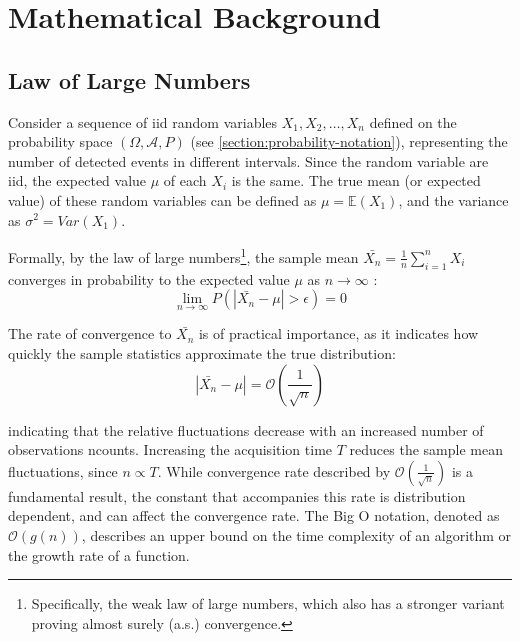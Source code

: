 \chapter{Mathematical Background}
\label{appendix:mathematical-notation}

\section{Law of Large Numbers}\label{section:law-of-large-numbers}
Consider a sequence of \gls{iid} random variables $X_1, X_2, \dots, X_n$ defined on the probability space $(\Omega, \mathcal{A}, P)$ (see \cref{section:probability-notation}), representing the number of detected events in different intervals. Since the random variable are \gls{iid}, the expected value $\mu$ of each $X_i$ is the same. The true mean (or expected value) of these random variables can be defined as $\mu = \mathbb{E}(X_1)$, and the variance as $\sigma^2 = Var(X_1)$.

Formally, by the law of large numbers\footnote{Specifically, the weak law of large numbers, which also has a stronger variant proving almost surely (a.s.) convergence.}, the sample mean $\bar{X_n} = \frac{1}{n} \sum_{i=1}^{n} X_i$ converges in probability to the expected value $\mu$ as $n \to \infty$ \cite{fellerIntroductionProbabilityTheory1991a}:
\begin{equation}
    \lim_{n \to \infty} P(|\bar{X_n} - \mu| > \epsilon) = 0
\end{equation}

The rate of convergence to $\bar{X_n}$ is of practical importance, as it indicates how quickly the sample statistics approximate the true distribution:
\begin{equation}
    \left|\bar{X_n} - \mu\right| = \mathcal{O}\left(\frac{1}{\sqrt{n}}\right)
\end{equation}

indicating that the relative fluctuations decrease with an increased number of observations \gls{ncounts}.  Increasing the acquisition time $T$ reduces the sample mean fluctuations, since $n \propto T$. While convergence rate described by $\mathcal{O}\left(\frac{1}{\sqrt{n}}\right)$ is a fundamental result, the constant that accompanies this rate is distribution dependent, and can affect the convergence rate. The Big O notation, denoted as $\mathcal{O}(g(n))$, describes an upper bound on the time complexity of an algorithm or the growth rate of a function.

